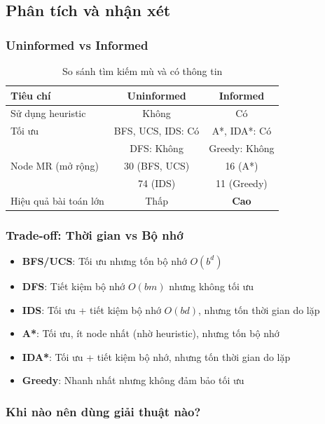 \documentclass[a4paper,12pt]{article}
\begin{document}
\subsection{Phân tích và nhận xét}

\subsubsection{Uninformed vs Informed}

\begin{table}[H]
\centering
\caption{So sánh tìm kiếm mù và có thông tin}
\begin{tabular}{@{}lcc@{}}
\toprule
\textbf{Tiêu chí} & \textbf{Uninformed} & \textbf{Informed} \\
\midrule
Sử dụng heuristic & Không & Có \\
Tối ưu & BFS, UCS, IDS: Có & A*, IDA*: Có \\
& DFS: Không & Greedy: Không \\
Node MR (mở rộng) & 30 (BFS, UCS) & 16 (A*) \\
& 74 (IDS) & 11 (Greedy) \\
Hiệu quả bài toán lớn & Thấp & \textbf{Cao} \\
\bottomrule
\end{tabular}
\end{table}

\subsubsection{Trade-off: Thời gian vs Bộ nhớ}

\begin{itemize}
    \item \textbf{BFS/UCS}: Tối ưu nhưng tốn bộ nhớ $O(b^d)$
    \item \textbf{DFS}: Tiết kiệm bộ nhớ $O(bm)$ nhưng không tối ưu
    \item \textbf{IDS}: Tối ưu + tiết kiệm bộ nhớ $O(bd)$, nhưng tốn thời gian do lặp
    \item \textbf{A*}: Tối ưu, ít node nhất (nhờ heuristic), nhưng tốn bộ nhớ
    \item \textbf{IDA*}: Tối ưu + tiết kiệm bộ nhớ, nhưng tốn thời gian do lặp
    \item \textbf{Greedy}: Nhanh nhất nhưng không đảm bảo tối ưu
\end{itemize}

\subsubsection{Khi nào nên dùng giải thuật nào?}
\end{document}
